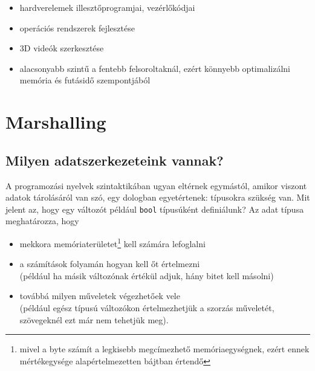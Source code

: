 \documentclass[tocnopagenum]{thesis-ekf}
\theoremstyle{definition}
\theoremstyle{remark}
\begin{document}
\begin{enumerate}
\begin{itemize}
			\item hardverelemek illesztőprogramjai, vezérlőkódjai
			\item operációs rendszerek fejlesztése
			\item 3D videók szerkesztése
			\item alacsonyabb szintű a fentebb felsoroltaknál, ezért könnyebb optimalizálni memória és futásidő szempontjából
			\cite{clang1}
		\end{itemize}
	\end{enumerate}\cite{proglanguages1}\cite{proglanguages2}
	
	\chapter{Marshalling}
	\section{Milyen adatszerkezeteink vannak?}
	A programozási nyelvek szintaktikában ugyan eltérnek egymástól, amikor viszont adatok tárolásáról van szó, egy dologban egyetértenek: típusokra szükség van. Mit jelent az, hogy egy változót például \verb*|bool| típusúként definiálunk? Az adat típusa meghatározza, hogy
	\begin{itemize}
		\item mekkora memóriaterületet\footnote{mivel a byte számít a legkisebb megcímezhető memóriaegységnek, ezért ennek mértékegysége alapértelmezetten bájtban értendő} kell számára lefoglalni
		\item a számítások folyamán hogyan kell őt értelmezni\\(például ha másik változónak értékül adjuk, hány bitet kell másolni)
		\item továbbá milyen műveletek végezhetőek vele\\(például egész típusú változókon értelmezhetjük a szorzás műveletét, szövegeknél ezt már nem tehetjük meg).
	\end{itemize} \cite{adatszerkezetek_88}
\end{document}
